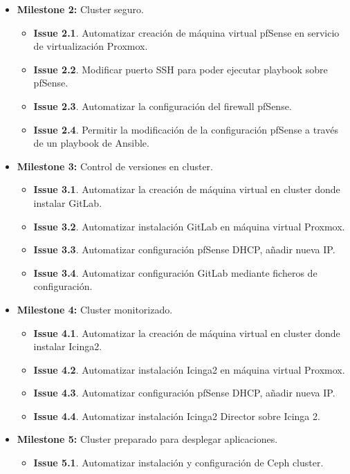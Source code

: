 \begin{text}
\begin{itemize}
\begin{itemize}
		\end{itemize}
		\item \textbf{Milestone 2:} Cluster seguro.
		\begin{itemize}
			\item \textbf{Issue 2.1}. Automatizar creación de máquina virtual pfSense en servicio de virtualización Proxmox.
			\item \textbf{Issue 2.2}. Modificar puerto SSH para poder ejecutar playbook sobre pfSense.
			\item \textbf{Issue 2.3}. Automatizar la configuración del firewall pfSense.
			\item \textbf{Issue 2.4}. Permitir la modificación de la configuración pfSense a través de un playbook de Ansible.
		\end{itemize}
		\item \textbf{Milestone 3:} Control de versiones en cluster.
		\begin{itemize}
			\item \textbf{Issue 3.1}. Automatizar la creación de máquina virtual en cluster donde instalar GitLab.
			\item \textbf{Issue 3.2}. Automatizar instalación GitLab en máquina virtual Proxmox.
			\item \textbf{Issue 3.3}. Automatizar configuración pfSense DHCP, añadir nueva IP.
			\item \textbf{Issue 3.4}. Automatizar configuración GitLab mediante ficheros de configuración.
		\end{itemize}
		\item \textbf{Milestone 4:} Cluster monitorizado.
		\begin{itemize}
			\item \textbf{Issue 4.1}. Automatizar la creación de máquina virtual en cluster donde instalar Icinga2.
			\item \textbf{Issue 4.2}. Automatizar instalación Icinga2 en máquina virtual Proxmox.
			\item \textbf{Issue 4.3}. Automatizar configuración pfSense DHCP, añadir nueva IP.
			\item \textbf{Issue 4.4}. Automatizar instalación Icinga2 Director sobre Icinga 2.
		\end{itemize}
		\item \textbf{Milestone 5:} Cluster preparado para desplegar aplicaciones.
		\begin{itemize}
			\item \textbf{Issue 5.1}. Automatizar instalación y configuración de Ceph cluster.

\end{itemize}
\end{itemize}
\end{text}
